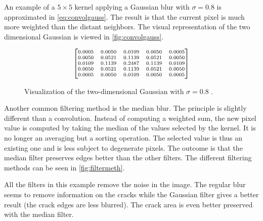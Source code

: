 An example of a $5 \times 5$ kernel applying a Gaussian blur with $\sigma = 0.8$ is approximated in \eqref{eq:convolgauss}. The result is that the current pixel is much more weighted than the distant neighbors. The visual representation of the two dimensional Gaussian is viewed in \autoref{fig:convolgauss}.

\begin{equation}
\label{eq:convolgauss}
{\scriptsize
\begin{bmatrix}
0.0005 & 0.0050 & 0.0109 & 0.0050 & 0.0005 \\
0.0050 & 0.0521 & 0.1139 & 0.0521 & 0.0050 \\
0.0109 & 0.1139 & 0.2487 & 0.1139 & 0.0109 \\
0.0050 & 0.0521 & 0.1139 & 0.0521 & 0.0050 \\
0.0005 & 0.0050 & 0.0109 & 0.0050 & 0.0005 \\
\end{bmatrix}
}
\end{equation}

\begin{figure}[!ht]
\centering
{}
\caption{Visualization of the two-dimensional Gaussian with $\sigma = 0.8 $ .}
\label{fig:convolgauss}
\end{figure}

Another common filtering method is the median blur. The principle is slightly different than a convolution. Instead of computing a weighted sum, the new pixel value is computed by taking the median of the values selected by the kernel. It is no longer an averaging but a sorting operation. The selected value is thus an existing one and is less subject to degenerate pixels. The outcome is that the median filter preserves edges better than the other filters. The different filtering methods can be seen in \autoref{fig:filtermeth}.

All the filters in this example remove the noise in the image. The regular blur seems to remove information on the cracks while the Gaussian filter gives a better result (the crack edges are less blurred). The crack area is even better preserved with the median filter.

